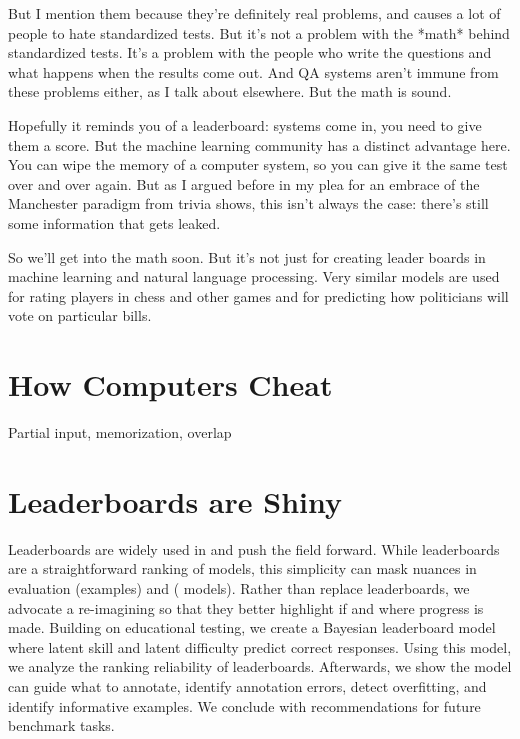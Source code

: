 But I mention them because they’re definitely real problems, and causes a lot
of people to hate standardized tests.  But it’s not a problem with the *math*
behind standardized tests.  It’s a problem with the people who write the
questions and what happens when the results come out.  And QA systems aren’t
immune from these problems either, as I talk about elsewhere.  But the math is
sound.

Hopefully it reminds you of a leaderboard: systems come in, you need to give
them a score.  But the machine learning community has a distinct advantage
here.  You can wipe the memory of a computer system, so you can give it the
same test over and over again.  But as I argued before in my plea for an
embrace of the Manchester paradigm from trivia shows, this isn’t always the
case: there’s still some information that gets leaked.


So we’ll get into the math soon.  But it's not just for creating leader boards
in machine learning and natural language processing.  Very similar models are
used for rating players in chess and other games and for predicting how
politicians will vote on particular bills.

\section{How Computers Cheat}
\label{sec:cheating}

Partial input, memorization, overlap

\section{Leaderboards are Shiny}
\label{ch:isicle:intro}


Leaderboards are widely used in \nlp{} and push the field forward.  While
leaderboards are a straightforward ranking of \nlp{} models, this simplicity
can mask nuances in evaluation \itms{} (examples) and \subjs{} (\nlp{}
models).  Rather than replace leaderboards, we advocate a re-imagining so that
they better highlight if and where progress is made.  Building on educational
testing, we create a Bayesian leaderboard model where latent \subj{} skill and
latent \itm{} difficulty predict correct responses.  Using this model, we
analyze the ranking reliability of leaderboards.  Afterwards, we show the
model can guide what to annotate, identify annotation errors, detect
overfitting, and identify informative examples.  We conclude with
recommendations for future benchmark tasks.



